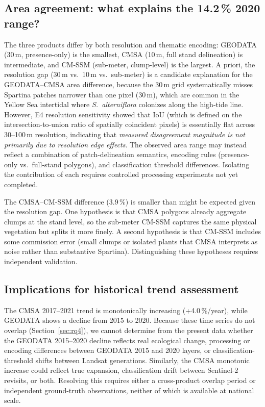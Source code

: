 \documentclass[11pt]{article}
\begin{document}
\subsection{Area agreement: what explains the 14.2\,\% 2020 range?}

The three products differ by both resolution and thematic encoding: GEODATA
(30\,m, presence-only) is the smallest, CMSA (10\,m, full stand delineation) is
intermediate, and CM-SSM (sub-meter, clump-level) is the largest. A priori,
the resolution gap (30\,m vs.\ 10\,m vs.\ sub-meter) is a candidate explanation
for the GEODATA--CMSA area difference, because the 30\,m grid systematically
misses Spartina patches narrower than one pixel (30\,m), which are common in
the Yellow Sea intertidal where \textit{S.~alterniflora} colonizes along the
high-tide line. However, E4 resolution sensitivity showed that IoU (which is
defined on the intersection-to-union ratio of spatially coincident pixels) is
essentially flat across 30--100\,m resolution, indicating that \emph{measured
disagreement magnitude is not primarily due to resolution edge effects}.
The observed area range may instead reflect a combination of patch-delineation
semantics, encoding rules (presence-only vs.\ full-stand polygons), and
classification threshold differences. Isolating the contribution of each
requires controlled processing experiments not yet completed.

The CMSA--CM-SSM difference (3.9\,\%) is smaller than might be expected given
the resolution gap. One hypothesis is that CMSA polygons already aggregate
clumps at the stand level, so the sub-meter CM-SSM captures the same physical
vegetation but splits it more finely. A second hypothesis is that CM-SSM
includes some commission error (small clumps or isolated plants that CMSA
interprets as noise rather than substantive Spartina). Distinguishing these
hypotheses requires independent validation.

\subsection{Implications for historical trend assessment}

The CMSA 2017--2021 trend is monotonically increasing (+4.0\,\%/year), while
GEODATA shows a decline from 2015 to 2020. Because these time series do not
overlap (Section~\ref{sec:rq4}), we cannot determine from the present data
whether the GEODATA 2015--2020 decline reflects real ecological change,
processing or encoding differences between GEODATA 2015 and 2020 layers, or
classification-threshold shifts between Landsat generations. Similarly, the
CMSA monotonic increase could reflect true expansion, classification drift
between Sentinel-2 revisits, or both. Resolving this requires either a
cross-product overlap period or independent ground-truth observations, neither
of which is available at national scale.
\end{document}
